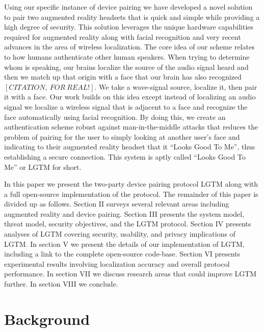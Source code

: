 \documentclass[12pt]{report}
\begin{document}
Using our specific instance of device pairing we have developed a novel solution to pair two augmented reality headsets that is quick and simple while providing a high degree of security. This solution leverages the unique hardware capabilities required for augmented reality along with facial recognition and very recent advances in the area of wireless localization. The core idea of our scheme relates to how humans authenticate other human speakers. When trying to determine whom is speaking, our brains localize the source of the audio signal heard and then we match up that origin with a face that our brain has also recognized $[CITATION, \: FOR \: REAL!]$. We take a wave-signal source, localize it, then pair it with a face. Our work builds on this idea except instead of localizing an audio signal we localize a wireless signal that is adjacent to a face and recognize the face automatically using facial recognition. By doing this, we create an authentication scheme robust against man-in-the-middle attacks that reduces the problem of pairing for the user to simply looking at another user's face and indicating to their augmented reality headset that it ``Looks Good To Me'', thus establishing a secure connection. This system is aptly called ``Looks Good To Me'' or LGTM for short. \par

In this paper we present the two-party device pairing protocol LGTM along with a full open-source implementation of the protocol. The remainder of this paper is divided up as follows. Section II surveys several relevant areas including augmented reality and device pairing. Section III presents the system model, threat model, security objectives, and the LGTM protocol. Section IV presents analyses of LGTM covering security, usability, and privacy implications of LGTM. In section V we present the details of our implementation of LGTM, including a link to the complete open-source code-base. Section VI presents experimental results involving localization accuracy and overall protocol performance. In section VII we discuss research areas that could improve LGTM further. In section VIII we conclude. \par


\section{Background}
\end{document}
